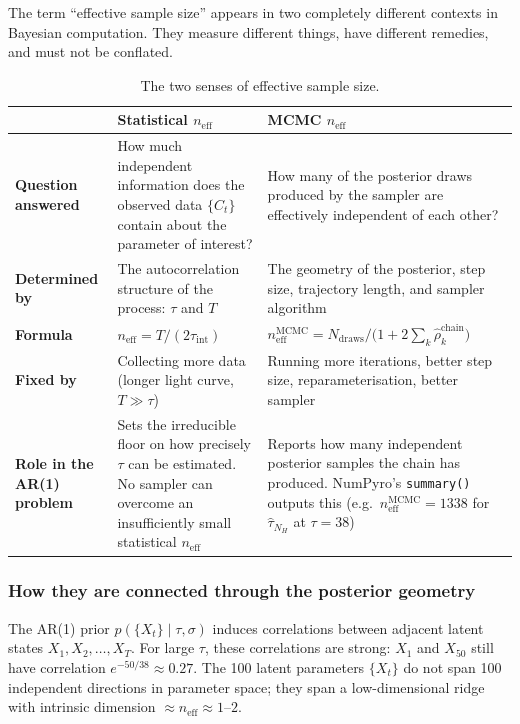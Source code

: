 \documentclass[11pt, a4paper]{article}
\begin{document}
The term ``effective sample size'' appears in two completely different contexts in
Bayesian computation.
They measure different things, have different remedies, and must not be conflated.

\begin{table}[h!]
\centering
\caption{The two senses of effective sample size.}
\label{tab:neff_comparison}
\begin{tabular}{p{3.5cm} p{5.5cm} p{5.5cm}}
\toprule
 & \textbf{Statistical $n_\mathrm{eff}$} & \textbf{MCMC $n_\mathrm{eff}$} \\
\midrule
\textbf{Question answered} &
How much independent information does the observed data $\{C_t\}$ contain about
the parameter of interest? &
How many of the posterior draws produced by the sampler are effectively independent
of each other? \\[6pt]
\textbf{Determined by} &
The autocorrelation structure of the process: $\tau$ and $T$ &
The geometry of the posterior, step size, trajectory length, and sampler algorithm \\[6pt]
\textbf{Formula} &
$n_\mathrm{eff} = T/(2\tau_\mathrm{int})$ &
$n_\mathrm{eff}^\mathrm{MCMC} = N_\mathrm{draws}/\bigl(1 + 2\sum_{k}\hat\rho_k^\mathrm{chain}\bigr)$ \\[6pt]
\textbf{Fixed by} &
Collecting more data (longer light curve, $T \gg \tau$) &
Running more iterations, better step size, reparameterisation, better sampler \\[6pt]
\textbf{Role in the AR(1) problem} &
Sets the irreducible floor on how precisely $\tau$ can be estimated.
No sampler can overcome an insufficiently small statistical $n_\mathrm{eff}$ &
Reports how many independent posterior samples the chain has produced.
NumPyro's \texttt{summary()} outputs this (e.g.\ $n_\mathrm{eff}^\mathrm{MCMC} = 1338$
for $\hat\tau_{N_H}$ at $\tau=38$) \\
\bottomrule
\end{tabular}
\end{table}

\subsubsection*{How they are connected through the posterior geometry}

The AR(1) prior $p(\{X_t\} \mid \tau, \sigma)$ induces correlations between adjacent
latent states $X_1, X_2, \ldots, X_T$.
For large $\tau$, these correlations are strong: $X_1$ and $X_{50}$ still have
correlation $e^{-50/38} \approx 0.27$.
The 100 latent parameters $\{X_t\}$ do not span 100 independent directions in
parameter space; they span a low-dimensional ridge with intrinsic dimension
$\approx n_\mathrm{eff} \approx 1$--$2$.
\end{document}
